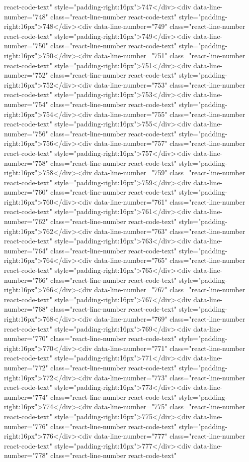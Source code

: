 react-code-text" style="padding-right:16px">747</div><div data-line-number="748" class="react-line-number react-code-text" style="padding-right:16px">748</div><div data-line-number="749" class="react-line-number react-code-text" style="padding-right:16px">749</div><div data-line-number="750" class="react-line-number react-code-text" style="padding-right:16px">750</div><div data-line-number="751" class="react-line-number react-code-text" style="padding-right:16px">751</div><div data-line-number="752" class="react-line-number react-code-text" style="padding-right:16px">752</div><div data-line-number="753" class="react-line-number react-code-text" style="padding-right:16px">753</div><div data-line-number="754" class="react-line-number react-code-text" style="padding-right:16px">754</div><div data-line-number="755" class="react-line-number react-code-text" style="padding-right:16px">755</div><div data-line-number="756" class="react-line-number react-code-text" style="padding-right:16px">756</div><div data-line-number="757" class="react-line-number react-code-text" style="padding-right:16px">757</div><div data-line-number="758" class="react-line-number react-code-text" style="padding-right:16px">758</div><div data-line-number="759" class="react-line-number react-code-text" style="padding-right:16px">759</div><div data-line-number="760" class="react-line-number react-code-text" style="padding-right:16px">760</div><div data-line-number="761" class="react-line-number react-code-text" style="padding-right:16px">761</div><div data-line-number="762" class="react-line-number react-code-text" style="padding-right:16px">762</div><div data-line-number="763" class="react-line-number react-code-text" style="padding-right:16px">763</div><div data-line-number="764" class="react-line-number react-code-text" style="padding-right:16px">764</div><div data-line-number="765" class="react-line-number react-code-text" style="padding-right:16px">765</div><div data-line-number="766" class="react-line-number react-code-text" style="padding-right:16px">766</div><div data-line-number="767" class="react-line-number react-code-text" style="padding-right:16px">767</div><div data-line-number="768" class="react-line-number react-code-text" style="padding-right:16px">768</div><div data-line-number="769" class="react-line-number react-code-text" style="padding-right:16px">769</div><div data-line-number="770" class="react-line-number react-code-text" style="padding-right:16px">770</div><div data-line-number="771" class="react-line-number react-code-text" style="padding-right:16px">771</div><div data-line-number="772" class="react-line-number react-code-text" style="padding-right:16px">772</div><div data-line-number="773" class="react-line-number react-code-text" style="padding-right:16px">773</div><div data-line-number="774" class="react-line-number react-code-text" style="padding-right:16px">774</div><div data-line-number="775" class="react-line-number react-code-text" style="padding-right:16px">775</div><div data-line-number="776" class="react-line-number react-code-text" style="padding-right:16px">776</div><div data-line-number="777" class="react-line-number react-code-text" style="padding-right:16px">777</div><div data-line-number="778" class="react-line-number react-code-text" 